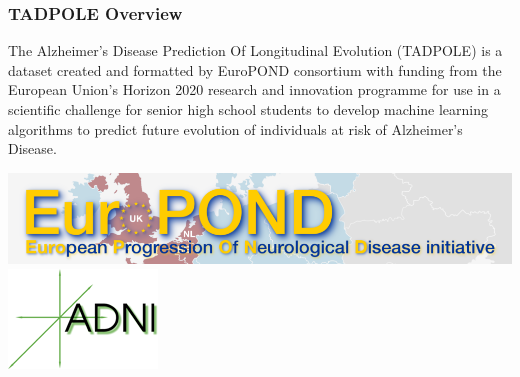 \documentclass{beamer}
\begin{document}
    \begin{frame}
        \frametitle{TADPOLE Overview}
        The Alzheimer’s Disease Prediction Of Longitudinal Evolution (TADPOLE) is a dataset created and formatted by EuroPOND consortium with funding from the European Union’s Horizon 2020 research and innovation programme for use in a scientific challenge for senior high school students to develop machine learning algorithms to predict future evolution of individuals at risk of Alzheimer's Disease.\\
        \begin{center}
        \includegraphics[height=.15\paperheight]{images/europond.png}\includegraphics[height=.15\paperheight]{images/adni.png}
        \end{center}
    \end{frame}
\end{document}
